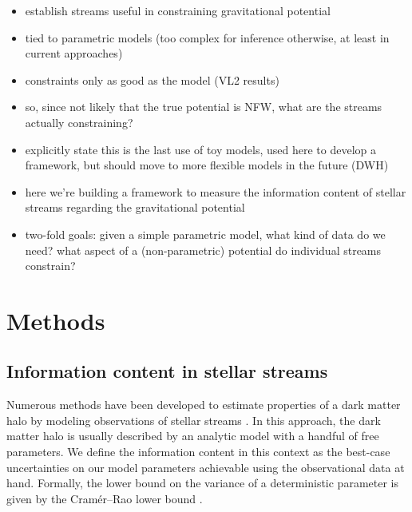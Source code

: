 \documentclass[modern]{aastex61}
\newcommand{\acronym}[1]{{\small{#1}}}
\newcommand{\CRLB}{\acronym{CRLB}}
\begin{document}
\begin{itemize}
 \item establish streams useful in constraining gravitational potential
 \item tied to parametric models (too complex for inference otherwise, at least in current approaches)
 \item constraints only as good as the model (VL2 results)
 \item so, since not likely that the true potential is NFW, what are the streams actually constraining? 
 \item explicitly state this is the last use of toy models, used here to develop a framework, but should move to more flexible models in the future (DWH)
 \item here we're building a framework to measure the information content of stellar streams regarding the gravitational potential
 \item two-fold goals: given a simple parametric model, what kind of data do we need? what aspect of a (non-parametric) potential do individual streams constrain?
\end{itemize}


\section{Methods}
\label{sec:method}

\subsection{Information content in stellar streams}
Numerous methods have been developed to estimate properties of a dark matter halo by modeling observations of stellar streams \citep[e.g.,][]{}.
In this approach, the dark matter halo is usually described by an analytic model with a handful of free parameters.
We define the information content in this context as the best-case uncertainties on our model parameters achievable using the observational data at hand.
Formally, the lower bound on the variance of a deterministic parameter is given by the Cram\' er--Rao lower bound \citep[\CRLB,][]{Cramer1946, Rao1945}.
\end{document}
